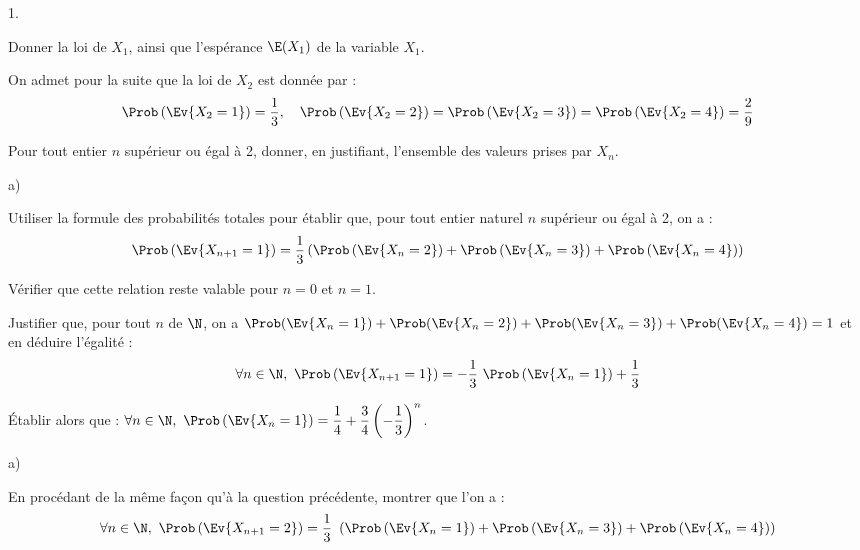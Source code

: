 \documentclass[11pt]{article}%
\begin{document}
\begin{noliste}{1.}
  \setlength{\itemsep}{4mm}
\item Donner la loi de $X_{1}$, ainsi que l'espérance $\E(X_{1})$ de
  la variable $X_{1}$.

  
  On admet pour la suite que la loi de $X_{2}$ est donnée par :
  \[
  \Prob\left(\Ev{X_{2} = 1}\right) = \dfrac{1}{3}, \quad
  \Prob\left(\Ev{X_{2} = 2}\right) = \Prob\left(\Ev{X_{2} = 3}\right)
  = \Prob\left(\Ev{X_{2} = 4}\right) = \dfrac{2}{9}
  \]




\item Pour tout entier $n$ supérieur ou égal à 2, donner, en
  justifiant, l'ensemble des valeurs prises par $X_{n}$.

  

\item
  \begin{noliste}{a)}
    \setlength{\itemsep}{2mm}
  \item Utiliser la formule des probabilités totales pour établir que,
    pour tout entier naturel $n$ supérieur ou égal à 2, on a :
    \[
    \Prob\left(\Ev{X_{n + 1} = 1}\right) =
    \dfrac{1}{3}\left(\Prob\left(\Ev{X_{n} = 2}\right) + \Prob\left(\Ev{X_{n}
          = 3}\right) + \Prob\left(\Ev{X_{n} = 4}\right)\right)
    \]

    

  \item Vérifier que cette relation reste valable pour $n = 0$ et $n =
    1$.

    

  \item Justifier que, pour tout $n$ de $\N$, on a $\Prob(\Ev{X_{n} =
      1}) + \Prob(\Ev{X_{n} = 2}) + \Prob(\Ev{X_{n} = 3}) +
    \Prob(\Ev{X_{n} = 4}) = 1$ et en déduire l'égalité :
    \[
    \forall n \in \N, \ \Prob\left(\Ev{X_{n + 1} = 1}\right) =
    -\dfrac{1}{3} \ \Prob\left(\Ev{X_{n} = 1}\right) + \dfrac{1}{3}
    \]

    




  \item Établir alors que : $\forall n \in \N, \ \Prob\left(\Ev{X_{n}
        = 1}\right) = \dfrac{1}{4} +
    \dfrac{3}{4}\left(-\dfrac{1}{3}\right)^{n}$.

    
  \end{noliste}
  



\item
  \begin{noliste}{a)}
    \setlength{\itemsep}{2mm}
  \item En procédant de la même façon qu'à la question précédente,
    montrer que l'on a :
    \[
    \forall n \in \N, \ \Prob\left(\Ev{X_{n + 1} = 2}\right) =
    \dfrac{1}{3} \ \left( \Prob\left(\Ev{X_{n} = 1}\right) +
      \Prob\left(\Ev{X_{n} = 3}\right) + \Prob\left(\Ev{X_{n} =
          4}\right)\right)
    \]


\end{noliste}
\end{noliste}
\end{document}
